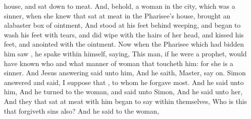 {house, and sat down to
meat.
And,
behold, a
woman
in the
city,
which
was a
sinner, when she
knew
that
{} sat at
meat
in the
Pharisee’s
house,
brought an alabaster
box of
ointment,
And
stood
at
his
feet
behind
{}
weeping, and
began to
wash
his
feet with
tears,
and did
wipe
{} with the
hairs of
her
head,
and
kissed
his
feet,
and
anointed
{} with the
ointment.
Now
when the
Pharisee
which had
bidden
him
saw
{}, he
spake
within
himself,
saying, This
man,
if he
were a
prophet, would have
known
who
and what
manner of
woman
{}
that
toucheth
him:
for she
is a
sinner.
And
Jesus
answering
said
unto
him,
{}
And he
saith,
Master, say
on.
Simon
answered
and
said, I
suppose
that
{}, to
whom he
forgave
most.
And he
said unto
him,
{}
And he
turned
to the
woman, and
said unto
Simon,
{}
And he
said unto
her,
{}
And
they
that sat at meat with
him
began to
say
within
themselves,
Who
is
this
that
forgiveth
sins
also?
And he
said
to the
woman,
{}

}
